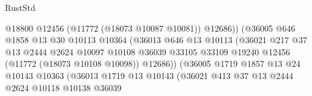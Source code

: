 \begin{lexlean}{RustStd}
\begin{coremodule}
                                            @18800
                                            @12456
                                            (@11772 (@18073 @10087 @10081))
                                            @12686))
                                        (@36005
                                          @646
                                          @1858
                                          @13
                                          @30
                                          @10113
                                          @10364
                                          (@36013
                                            @646
                                            @13
                                            @10113
                                            (@36021
                                              @217
                                              @37
                                              @13
                                              @2444
                                              @2624
                                              @10097
                                              @10108
                                              @36039
                                              @33105
                                              @33109
                                              @19240
                                              @12456
                                              (@11772 (@18073 @10108 @10098))
                                              @12686))
                                          (@36005
                                            @1719
                                            @1857
                                            @13
                                            @24
                                            @10143
                                            @10363
                                            (@36013
                                              @1719
                                              @13
                                              @10143
                                              (@36021
                                                @413
                                                @37
                                                @13
                                                @2444
                                                @2624
                                                @10118
                                                @10138
                                                @36039

\end{coremodule}
\end{lexlean}

